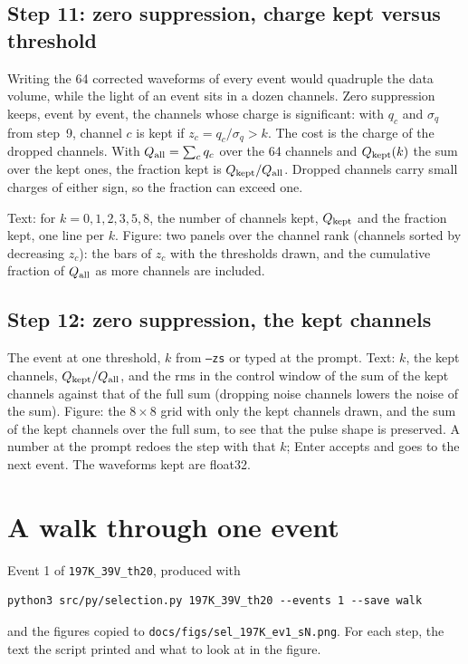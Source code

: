 \documentclass[11pt]{article}
\newcommand{\code}[1]{\texttt{#1}}
\begin{document}
\subsection{Step 11: zero suppression, charge kept versus threshold}

Writing the 64 corrected waveforms of every event would quadruple the data
volume, while the light of an event sits in a dozen channels. Zero
suppression keeps, event by event, the channels whose charge is
significant: with $q_c$ and $\sigma_q$ from step~9, channel $c$ is kept if
$z_c = q_c/\sigma_q > k$. The cost is the charge of the dropped channels.
With $Q_{\rm all} = \sum_c q_c$ over the 64 channels and $Q_{\rm kept}(k)$
the sum over the kept ones, the fraction kept is $Q_{\rm kept}/Q_{\rm
all}$. Dropped channels carry small charges of either sign, so the
fraction can exceed one.

Text: for $k = 0, 1, 2, 3, 5, 8$, the number of channels kept, $Q_{\rm
kept}$ and the fraction kept, one line per $k$. Figure: two panels over
the channel rank (channels sorted by decreasing $z_c$): the bars of
$z_c$ with the thresholds drawn, and the cumulative fraction of $Q_{\rm
all}$ as more channels are included.

\subsection{Step 12: zero suppression, the kept channels}

The event at one threshold, $k$ from \code{--zs} or typed at the prompt.
Text: $k$, the kept channels, $Q_{\rm kept}/Q_{\rm all}$, and the rms in
the control window of the sum of the kept channels against that of the
full sum (dropping noise channels lowers the noise of the sum). Figure:
the $8\times8$ grid with only the kept channels drawn, and the sum of the
kept channels over the full sum, to see that the pulse shape is
preserved. A number at the prompt redoes the step with that $k$; Enter
accepts and goes to the next event. The waveforms kept are float32.

\section{A walk through one event}

Event 1 of \code{197K\_39V\_th20}, produced with
\begin{lstlisting}
python3 src/py/selection.py 197K_39V_th20 --events 1 --save walk
\end{lstlisting}
and the figures copied to \code{docs/figs/sel\_197K\_ev1\_sN.png}. For
each step, the text the script printed and what to look at in the figure.
\end{document}
